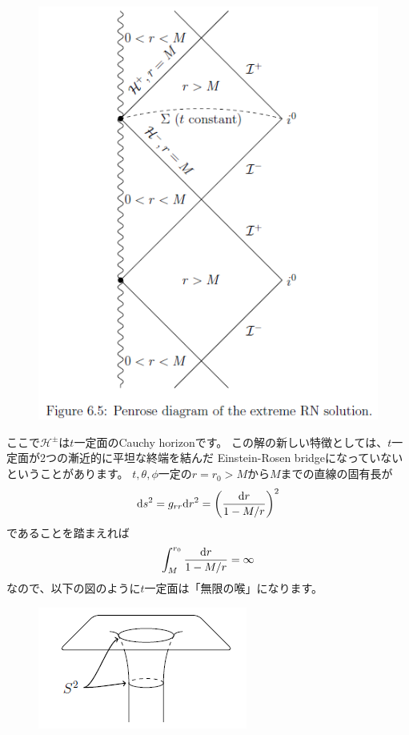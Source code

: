\documentclass[a4paper, 12pt]{jsarticle}
\theoremstyle{definition}
\newcommand{\ddif}{{\rm d}}
\begin{document}
\begin{figure}[h]
	\begin{center}
		\includegraphics[width=0.7\linewidth]{image/6.5.PNG}
	\end{center}
\end{figure}

ここで$\mathcal{H}^{\pm}$は$t$一定面のCauchy horizonです。
この解の新しい特徴としては、$t$一定面が2つの漸近的に平坦な終端を結んだ
Einstein-Rosen bridgeになっていないということがあります。
$t, \theta, \phi$一定の$r = r_0 > M$から$M$までの直線の固有長が
\begin{align}
	\ddif s^2 = g_{rr} \ddif r^2
	= \left( \frac{\ddif r}{1 - M/r} \right)^2
\end{align}
であることを踏まえれば
\begin{align}
	\int_M^{r_0} \frac{\ddif r}{1 - M/r} = \infty
\end{align}
なので、以下の図のように$t$一定面は「無限の喉」になります。
\begin{figure}[h]
	\begin{center}
		\includegraphics[width=0.4\linewidth]{image/6.6.PNG}
	\end{center}
\end{figure}
\end{document}
